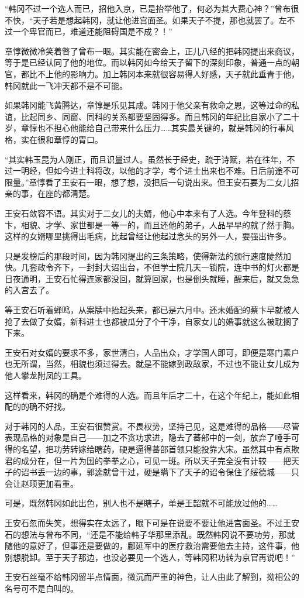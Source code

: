 “韩冈不过一个选人而已，招他入京，已是抬举他了，何必为其大费心神？”曾布很不快，“天子若是想起韩冈，就让他进宫面圣。如果天子不提，那也就罢了。左不过一个卑官而已，难道还能阻碍国是不成？！”

章惇微微冷笑着瞥了曾布一眼。其实能在密会上，正儿八经的把韩冈提出来商议，等于是已经认同了他的地位。而以韩冈如今给天子留下的深刻印象，普通一点的朝官，都比不上他的影响力。加上韩冈本来就很容易得人好感，天子就此垂青于他，韩冈就此一飞冲天都不是不可能。

如果韩冈能飞黄腾达，章惇是乐见其成。韩冈于他父亲有救命之恩，这等过命的私谊，比起同乡、同窗、同科的关系都要坚固得多。而且韩冈的年纪比自家小了二十岁，章惇也不担心他能给自己带来什么压力……其实最关键的，就是韩冈的行事风格，实在很和章惇的胃口。

“其实韩玉昆为人刚正，而且识量过人。虽然长于经史，疏于诗赋，若在往年，不过一明经，但如今进士科将改，以他的才学，考个进士出来也不难。日后前途不可限量。”章惇看了王安石一眼，想了想，没把后一句说出来。但王安石要为二女儿招亲的事，在座的都清楚。

王安石敛容不语。其实对于二女儿的夫婿，他心中本来有了人选。今年登科的蔡卞，相貌、才学、家世都是一等一的，而且还他的弟子，人品早早的就了然于胸。这样的女婿哪里挑得出毛病，比起曾经让他起过念头的另外一人，要强出许多。

只是发榜后的那段时间，因为韩冈提出的三条策略，使得新法的颁行速度陡然加快。几套政令齐下，一封封大诏出台，不但学士院几天一锁院，连中书的灯火都是日夜通明，王安石忙得连家都没回，就算回家，也是倒头就睡，醒来后，就又急急的入宫去了。

等王安石听着蝉鸣，从案牍中抬起头来，都已是六月中。还未婚配的蔡卞早就被人抢了去做了女婿，新科进士也都被瓜分了个干净，自家女儿的婚事就这么被耽搁了下来。

王安石对女婿的要求不多，家世清白，人品出众，才学国人即可，即便是寒门素户也无所谓，当然，相貌也须过得去。就是不能嫁到政敌家，不过也不能让女儿成为他人攀龙附凤的工具。

这样看来，韩冈的确是个难得的人选。而且年后才二十，在这个年纪上，能如此相配的的确不好找。

对于韩冈的人品，王安石很赞赏。不畏权势，坚持己见，这是难得的品格——尽管表现品格的对象是自己——加之不贪功求进，隐去了蕃部中的一剑，放弃了唾手可得的名望，把功劳转嫁给瞎药，硬是逼得蕃部首领只能投靠大宋。虽然其中有点欺君的成分在，但一片为国的拳拳之心，可见一斑。所以天子完全没有计较——把天子的诏书丢一边的事，郭逵就曾干过，硬是瞒下了天子的诏令保住了绥德城——只会让赵顼更加看重。

可是，既然韩冈如此出色，别人也不是瞎子，单是王韶就不可能放过他的……

王安石忽而失笑，想得实在太远了，眼下可是在说要不要让他进宫面圣。不过王安石的想法与曾布不同，“还是不能给韩子华那里添乱。既然韩冈说不要功劳，那就随他的意好了，但事还是要做的，鄜延军中的医疗救治需要他去主持，这件事，他别想脱卸。至于天子那边，也没必要见一个选人，等韩冈积功转为京官再说吧！”

王安石丝毫不给韩冈留半点情面，微沉而严重的神色，让人由此了解到，拗相公的名号可不是白叫的。

